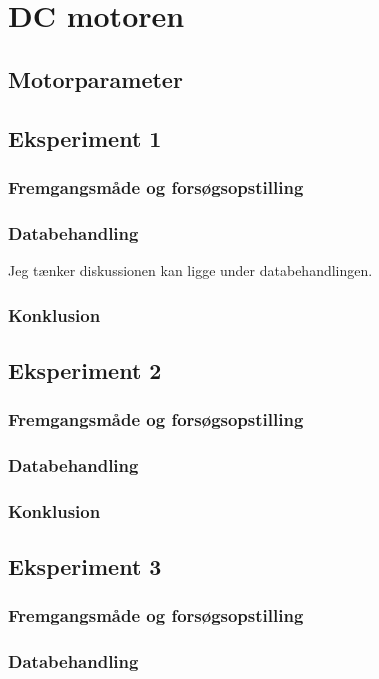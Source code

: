 \section{DC motoren}

\subsection{Motorparameter}
\subsection{Eksperiment 1}
\subsubsection{Fremgangsmåde og forsøgsopstilling}
\subsubsection{Databehandling}
Jeg tænker diskussionen kan ligge under databehandlingen. 
\subsubsection{Konklusion}

\subsection{Eksperiment 2}
\subsubsection{Fremgangsmåde og forsøgsopstilling}
\subsubsection{Databehandling}
\subsubsection{Konklusion}


\subsection{Eksperiment 3}
\subsubsection{Fremgangsmåde og forsøgsopstilling}
\subsubsection{Databehandling}
